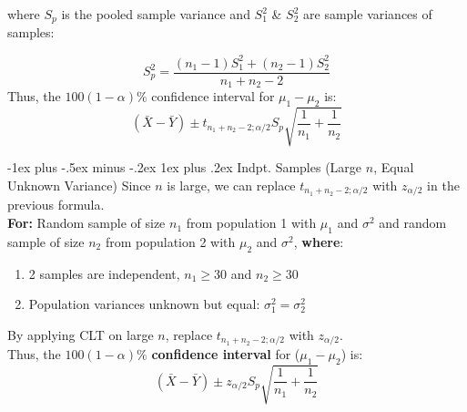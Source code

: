 \documentclass[12pt, landscape]{article}
\makeatletter
\renewcommand{\subsubsection}{\@startsection{subsubsection}{3}{0.1mm}%
                                {-1ex plus -.5ex minus -.2ex}%
                                {1ex plus .2ex}%
                                {\normalfont\small\bfseries}}
\makeatother
\begin{document}
\begin{multicols*}{3}
where $S_p$ is the pooled sample variance and $S_1^2$ \& $S_2^2$  are sample variances of samples:

\[S_p^2 = \frac{(n_1 - 1)S_1^2 + (n_2 - 1)S_2^2}{n_1 + n_2 - 2}\]
Thus, the $100(1-\alpha)\%$ confidence interval for $\mu_1 - \mu_2$ is:
\[(\bar{X} - \bar{Y}) \pm t_{n_1 + n_2 - 2; \alpha/2} S_p \sqrt{\frac{1}{n_1} + \frac{1}{n_2}}\]


\subsubsection{Indpt. Samples (Large $n$, Equal Unknown Variance)}
Since $n$ is large, we can replace $ t_{n_1 + n_2 - 2; \alpha/2}$ with $z_{
\alpha/2}$ in the previous formula. \\ \smallskip
\textbf{For:} Random sample of size $n_1$ from population 1 with $\mu_1$ and $\sigma^2$ and random sample of size $n_2$ from population 2 with $\mu_2$ and $\sigma^2$, \textbf{where}:
\begin{enumerate}
    \item 2 samples are independent, $n_1 \geq 30$ and $n_2 \geq 30$
    \item Population variances unknown but equal: $\sigma_1 ^2 = \sigma_2 ^2$
\end{enumerate}
By applying CLT on large $n$, replace $t_{n_1 + n_2 - 2; \alpha/2}$ with $z_{\alpha/2}$. \\
Thus, the $100(1-\alpha)\%$ \textbf{confidence interval} for ($\mu_1 - \mu_2$) is:
\[(\bar{X} - \bar{Y}) \pm z_{\alpha/2} S_p \sqrt{\frac{1}{n_1} + \frac{1}{n_2}}\]


\null \null
\columnbreak



\end{multicols*}
\end{document}
